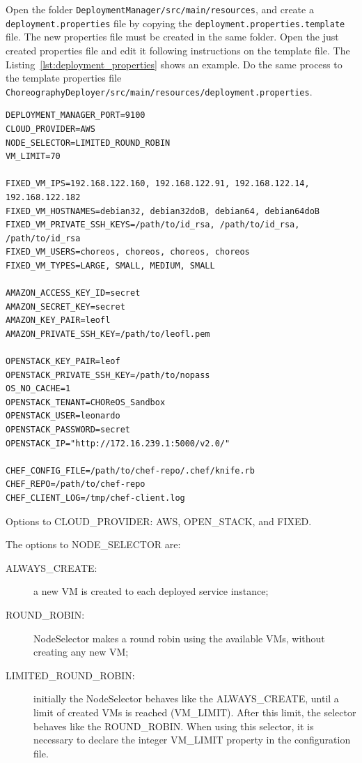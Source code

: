 \documentclass[a4paper, 10pt]{article}
\begin{document}
Open the folder \texttt{DeploymentManager/src/main/resources}, and create a \texttt{deployment.properties} file by copying the \texttt{deployment.properties.template} file. The new properties file must be created in the same folder. Open the just created properties file and edit it following instructions on the template file. The Listing~\ref{lst:deployment_properties} shows an example. Do the same process to the template properties file \texttt{ChoreographyDeployer/src/main/resources/deployment.properties}.

\lstset{
numbers=left
}

{\footnotesize
\begin{lstlisting}[caption=deployment.properties example,label=lst:deployment_properties] 
DEPLOYMENT_MANAGER_PORT=9100
CLOUD_PROVIDER=AWS
NODE_SELECTOR=LIMITED_ROUND_ROBIN
VM_LIMIT=70

FIXED_VM_IPS=192.168.122.160, 192.168.122.91, 192.168.122.14, 192.168.122.182
FIXED_VM_HOSTNAMES=debian32, debian32doB, debian64, debian64doB
FIXED_VM_PRIVATE_SSH_KEYS=/path/to/id_rsa, /path/to/id_rsa, /path/to/id_rsa
FIXED_VM_USERS=choreos, choreos, choreos, choreos
FIXED_VM_TYPES=LARGE, SMALL, MEDIUM, SMALL

AMAZON_ACCESS_KEY_ID=secret
AMAZON_SECRET_KEY=secret
AMAZON_KEY_PAIR=leofl
AMAZON_PRIVATE_SSH_KEY=/path/to/leofl.pem

OPENSTACK_KEY_PAIR=leof
OPENSTACK_PRIVATE_SSH_KEY=/path/to/nopass
OS_NO_CACHE=1
OPENSTACK_TENANT=CHOReOS_Sandbox
OPENSTACK_USER=leonardo
OPENSTACK_PASSWORD=secret
OPENSTACK_IP="http://172.16.239.1:5000/v2.0/"

CHEF_CONFIG_FILE=/path/to/chef-repo/.chef/knife.rb
CHEF_REPO=/path/to/chef-repo
CHEF_CLIENT_LOG=/tmp/chef-client.log 
\end{lstlisting}
}

Options to CLOUD\_PROVIDER: AWS, OPEN\_STACK, and FIXED.

The options to NODE\_SELECTOR are: 

\begin{description}
\item [ALWAYS\_CREATE:] a new VM is created to each deployed service instance;
\item [ROUND\_ROBIN:] \textsf{NodeSelector} makes a round robin using the available VMs, without creating any new VM;
\item [LIMITED\_ROUND\_ROBIN:] initially the \textsf{NodeSelector} behaves like the ALWAYS\_CREATE, until a limit of created VMs is reached (VM\_LIMIT). After this limit, the selector behaves like the ROUND\_ROBIN. When using this selector, it is necessary to declare the integer VM\_LIMIT property in the configuration file.
\end{description}
\end{document}
